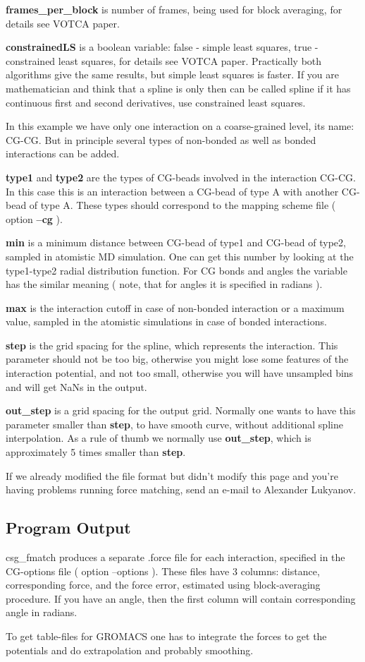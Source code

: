 \textbf{frames\_per\_block} is number of frames, being used for block averaging, for details see VOTCA paper.

\textbf{constrainedLS} is a boolean variable: false - simple least squares, true - constrained least squares, for details see VOTCA paper.
Practically both algorithms give the same results, but simple least squares is faster. If you are mathematician and think that a spline is only then can be called spline if it has continuous first and second derivatives, use constrained least squares.

In this example we have only one interaction on a coarse-grained level, its name: CG-CG. But in principle several types of non-bonded as well as bonded interactions can be added. 

\textbf{type1} and \textbf{type2} are the types of CG-beads involved in the interaction CG-CG. In this case this is an interaction between a CG-bead of type A with another CG-bead of type A. These types should correspond to the mapping scheme file ( option \textbf{--cg} ).
 
\textbf{min} is a minimum distance between CG-bead of type1 and CG-bead of type2,  sampled in atomistic MD simulation. One can get this number by looking at the type1-type2 radial distribution function. For CG bonds and angles the variable has the similar meaning ( note, that for angles it is specified in radians ).

\textbf{max} is the interaction cutoff in case of non-bonded interaction or a maximum value, sampled in the atomistic simulations in case of bonded interactions.

\textbf{step} is the grid spacing for the spline, which represents the interaction. This parameter should not be too big, otherwise you might lose some features of the interaction potential, and not too small, otherwise you will have unsampled bins and will get NaNs in the output.

\textbf{out\_step} is a grid spacing for the output grid. Normally one wants to have this parameter smaller than \textbf{step}, 
to have smooth curve, without additional spline interpolation. 
As a rule of thumb we normally use \textbf{out\_step}, which is approximately 5 times smaller than \textbf{step}.

If we already modified the file format but didn't modify this page and you're having problems running force matching, send an e-mail to Alexander Lukyanov.

\subsection{Program Output}
csg\_fmatch produces a separate .force file for each interaction, specified in the CG-options file ( option --options ).
These files have 3 columns: distance, corresponding force, and the force error, estimated using block-averaging procedure.
If you have an angle, then the first column will contain corresponding angle in radians.

To get table-files for GROMACS one has to integrate the forces to get the potentials and do extrapolation and probably smoothing.
